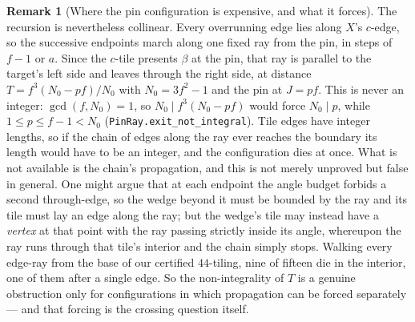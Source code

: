 \documentclass[11pt,reqno]{amsart}
\theoremstyle{plain}
\theoremstyle{definition}
\newtheorem{remark}[theorem]{Remark}
\begin{document}
\begin{remark}[Where the pin configuration is expensive, and what it forces]
The recursion is nevertheless collinear. Every overrunning edge lies along $X$'s $c$-edge, so the
successive endpoints march along one fixed ray from the pin, in steps of $f-1$ or $a$. Since the
$c$-tile presents $\beta$ at the pin, that ray is parallel to the target's left side and leaves
through the right side, at distance $T = f^{3}(N_0 - pf)/N_0$ with $N_0 = 3f^{2}-1$ and the pin at
$J = pf$. This is never an integer: $\gcd(f,N_0)=1$, so $N_0 \mid f^{3}(N_0-pf)$ would force
$N_0 \mid p$, while $1\le p\le f-1<N_0$ (\texttt{PinRay.exit\_not\_integral}). Tile edges have
integer lengths, so if the chain of edges along the ray ever reaches the boundary its length would
have to be an integer, and the configuration dies at once. What is not available is the chain's
propagation, and this is not merely unproved but false in general. One might argue that at each
endpoint the angle budget forbids a second through-edge, so the wedge beyond it must be bounded by
the ray and its tile must lay an edge along the ray; but the wedge's tile may instead have a
\emph{vertex} at that point with the ray passing strictly inside its angle, whereupon the ray runs
through that tile's interior and the chain simply stops. Walking every edge-ray from the base of
our certified $44$-tiling, nine of fifteen die in the interior, one of them after a single edge. So
the non-integrality of $T$ is a genuine obstruction only for configurations in which propagation
can be forced separately --- and that forcing is the crossing question itself.
\end{remark}
\end{document}

